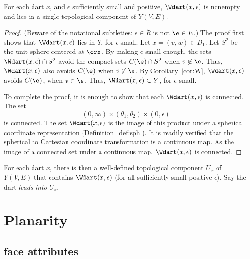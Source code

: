 \begin{lemma} 
For each dart $x$, and $\epsilon$ sufficiently small and positive,
$\Wdart(x,\epsilon)$ is nonempty and lies in a single 
topological component of $Y(V,E)$.
\end{lemma}
%
%

\begin{proof}  (Beware of the notational subtleties: $\epsilon\in\ring{R}$ is not $\e\in E$.)  The proof first shows that $\Wdart(x,\epsilon)$ lies in $Y$,
for $\epsilon$ small.  Let $x=(v,w)\in D_1$.  
Let $S^2$ be the unit sphere centered at $\orz$.
By making $\epsilon$ small enough,
the sets $\Wdart(x,\epsilon)\cap S^2$
avoid the compact sets $C(\e)\cap S^2$ when $v\not\in \e$.
Thus, $\Wdart(x,\epsilon)$ also avoids $C(\e)$ when $v\not\in \e$.
By Corollary~\ref{cor:W}, $\Wdart(x,\epsilon)$ avoids $C(\e)$, when $v\in \e$.
Thus, $\Wdart(x,\epsilon)\subset Y$, for $\epsilon$ small.

To complete the proof, it is enough to show that each $\Wdart(x,\epsilon)$ is
connected.  
The  set
   $$
    (0,\infty) \times (\theta_1,\theta_2) \times (0,\epsilon)
   $$
is connected.
The set $\Wdart(x,\epsilon)$  is the image of this product
under a spherical coordinate representation (Definition~\ref{def:sph}).
%
It is readily verified that the spherical to Cartesian coordinate transformation is
a continuous map. As the image of a connected set under a continuous map, $\Wdart(x,\epsilon)$ is connected.
\end{proof}
%
%

\begin{definition} For each dart $x$, 
there is then a well-defined topological
component $U_x$ of $Y(V,E)$ 
that contains $\Wdart(x,\epsilon)$ (for all
sufficiently small positive $\epsilon$). Say the dart {\it leads into}
$U_x$.
\end{definition}
%


\section{Planarity}


\subsection{face attributes}


